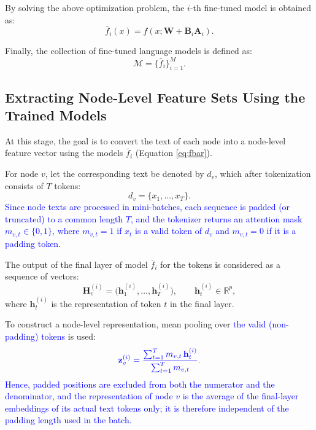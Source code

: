 \documentclass[a4paper,fleqn]{cas-sc}
\newcommand{\revtwo}[1]{\textcolor{blue}{#1}}  %
\begin{document}
By solving the above optimization problem, the $i$-th fine-tuned model is obtained as:
\begin{equation}
\bar{f}_i(x)=f(x;\mathbf{W}+\mathbf{B}_i\mathbf{A}_i).
\label{eq:fbar}
\end{equation}

Finally, the collection of fine-tuned language models is defined as:
\begin{equation}
\mathcal{M}=\{\bar{f}_i\}_{i=1}^{M}.
\end{equation}

\subsection{Extracting Node-Level Feature Sets Using the Trained Models}

At this stage, the goal is to convert the text of each node into a node-level feature vector using the models
$\bar{f}_i$
(Equation \ref{eq:fbar}).

For node $v$, let the corresponding text be denoted by $d_v$, which after tokenization consists of $T$ tokens:
\begin{equation}
d_v=\{x_1,\dots,x_T\}.
\end{equation}
\revtwo{Since node texts are processed in mini-batches, each sequence is padded (or truncated) to a common length $T$, and the tokenizer returns an attention mask $m_{v,t}\in\{0,1\}$, where $m_{v,t}=1$ if $x_t$ is a valid token of $d_v$ and $m_{v,t}=0$ if it is a padding token.}

The output of the final layer of model $\bar{f}_i$ for the tokens is considered as a sequence of vectors:
\begin{equation}
\mathbf{H}^{(i)}_v=\big(\mathbf{h}^{(i)}_{1},\dots,\mathbf{h}^{(i)}_{T}\big), \qquad \mathbf{h}^{(i)}_{t}\in\mathbb{R}^{p},
\end{equation}
where $\mathbf{h}^{(i)}_{t}$ is the representation of token $t$ in the final layer.

To construct a node-level representation, mean pooling over \revtwo{the valid (non-padding) tokens} is used:
\begin{equation}
\revtwo{\mathbf{z}^{(i)}_{v}=\frac{\sum_{t=1}^{T} m_{v,t}\,\mathbf{h}^{(i)}_{t}}{\sum_{t=1}^{T} m_{v,t}}.}
\end{equation}
\revtwo{Hence, padded positions are excluded from both the numerator and the denominator, and the representation of node $v$ is the average of the final-layer embeddings of its actual text tokens only; it is therefore independent of the padding length used in the batch.}
\end{document}
